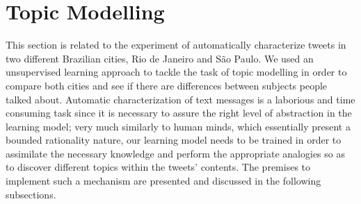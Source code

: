 
\section{Topic Modelling}\label{sec:topic_modeling}
This section is related to the experiment of automatically characterize tweets in two different Brazilian cities, Rio de Janeiro and São Paulo. We used an unsupervised learning approach to tackle the task of topic modelling in order to compare both cities and see if there are differences between subjects people talked about. Automatic characterization of text messages is a laborious and time consuming task since it is necessary to assure the right level of abstraction in the learning model; very much similarly to human minds, which essentially present a bounded rationality nature, our learning model needs to be trained in order to assimilate the necessary knowledge and perform the appropriate analogies so as to discover different topics within the tweets' contents. The premises to implement such a mechanism are presented and discussed in the following subsections.

